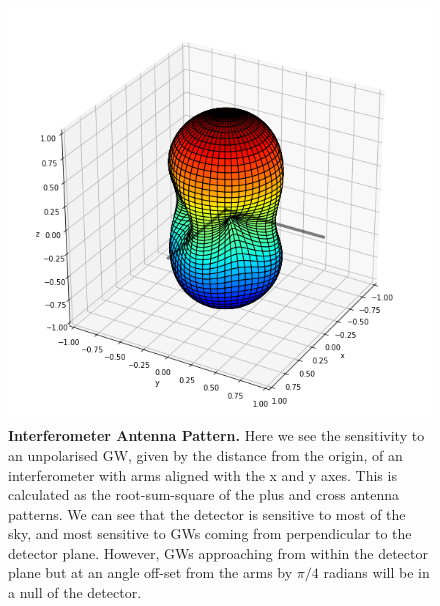 \documentclass[11pt]{cuthesis}
\newcommand{\fs}{\text{ .}}
\begin{document}


\begin{figure} %
\begin{center}
\includegraphics[width=0.8\linewidth]{antenna_pattern.png}
\end{center}
\caption{\textbf{Interferometer Antenna Pattern.} Here we see the sensitivity to an unpolarised GW, given by the distance from the origin, of an interferometer with arms aligned with the x and y axes. This is calculated as the root-sum-square of the plus and cross antenna patterns. We can see that the detector is sensitive to most of the sky, and most sensitive to GWs coming from perpendicular to the detector plane. However, GWs approaching from within the detector plane but at an angle off-set from the arms by $\pi/4$ radians will be in a null of the detector.}
\label{fig:antenna pattern}
\end{figure}
\end{document}
